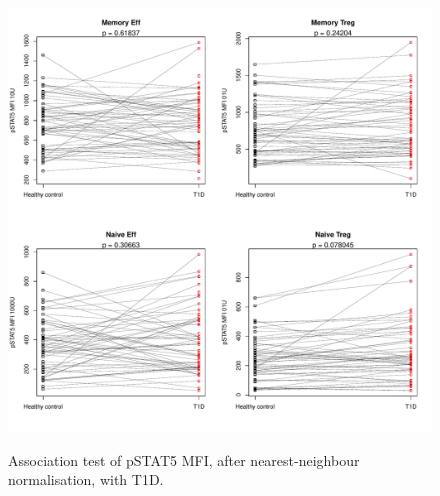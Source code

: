 \begin{figure}
\begin{minipage}{.7\textwidth}
\includegraphics[width=\linewidth]{figures/nn-pstat5-mfi-t1d-celltypes}
\end{minipage}
{ Association test of pSTAT5 MFI, after nearest-neighbour normalisation, with T1D.  }
{ }
{ }
\end{figure}

